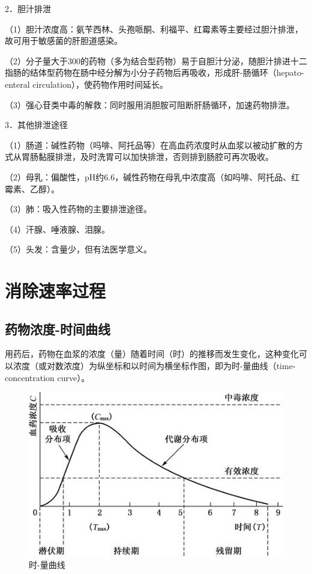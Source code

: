 2．胆汁排泄

（1）胆汁浓度高：氨苄西林、头孢哌酮、利福平、红霉素等主要经过胆汁排泄，故可用于敏感菌的肝胆道感染。

（2）分子量大于300的药物（多为结合型药物）易于自胆汁分泌，随胆汁排进十二指肠的结体型药物在肠中经分解为小分子药物后再吸收，形成肝-肠循环（hepato-enteral
circulation），使药物作用时间延长。

（3）强心苷类中毒的解救：同时服用消胆胺可阻断肝肠循环，加速药物排泄。

3．其他排泄途径

（1）肠道：碱性药物（吗啡、阿托品等）在高血药浓度时从血浆以被动扩散的方式从胃肠黏膜排泄，及时洗胃可以加快排泄，否则排到肠腔可再次吸收。

（2）母乳：偏酸性，pH约6.6，碱性药物在母乳中浓度高（如吗啡、阿托品、红霉素、乙醇）。

（3）肺：吸入性药物的主要排泄途径。

（4）汗腺、唾液腺、泪腺。

（5）头发：含量少，但有法医学意义。

\section{消除速率过程}

\subsection{药物浓度-时间曲线}

用药后，药物在血浆的浓度（量）随着时间（时）的推移而发生变化，这种变化可以浓度（或对数浓度）为纵坐标和以时间为横坐标作图，即为时-量曲线（time-concentration
curve）。

\begin{figure}[!htbp]
 \centering
 \includegraphics{./images/Image00044.jpg}
 \captionsetup{justification=centering}
 \caption{时-量曲线}
 \label{fig3-14}
  \end{figure} 

